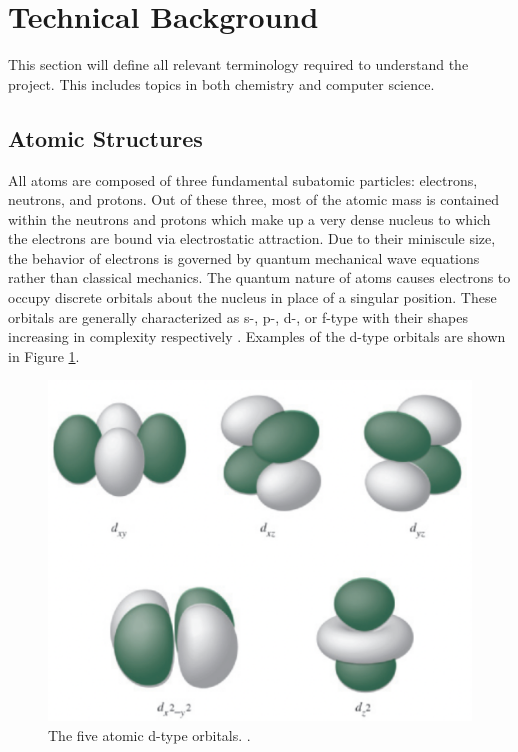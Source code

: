 \documentclass[10pt,twocolumn]{article}
\begin{document}
\section{Technical Background}
	This section will define all relevant terminology required to understand the project. This includes topics in both chemistry and computer science.

\subsection{Atomic Structures}
All atoms are composed of three fundamental subatomic particles: electrons, neutrons, and protons. Out of these three, most of the atomic mass is contained within the neutrons and protons which make up a very dense nucleus to which the electrons are bound via electrostatic attraction. Due to their miniscule size, the behavior of electrons is governed by quantum mechanical wave equations rather than classical mechanics. The quantum nature of atoms causes electrons to occupy discrete orbitals about the nucleus in place of a singular position. These orbitals are generally characterized as s-, p-, d-, or f-type with their shapes increasing in complexity respectively \cite{atkins2014}. Examples of the d-type orbitals are shown in Figure \ref{fig:dorbitals}.

\begin{figure}
	\centering
	\includegraphics[width=.95\linewidth]{dorbitals.png}
	\caption{
		The five atomic d-type orbitals. \cite{miessler_inorganic_2014}.
	}
	\label{fig:dorbitals}
\end{figure}
\end{document}
